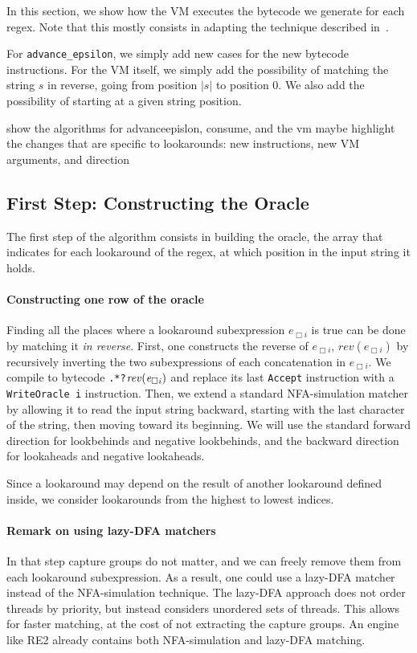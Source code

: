 \documentclass{article}
\renewcommand\cite\citep
\def\bytecode#1{\lstinline[style=byt]{#1}}
\def\regex#1{\lstinline[style=rgx]{#1}}
\def\todo#1{{\color{ACMOrange}{TODO: }}#1}
\def\size#1{\ensuremath{|#1|}}
\begin{document}
In this section, we show how the VM executes the bytecode we generate for each regex.
Note that this mostly consists in adapting the technique described in~\cite{regex_vm_approach}.

For \texttt{advance\_epsilon}, we simply add new cases for the new bytecode instructions.
For the VM itself, we simply add the possibility of matching the string $s$ in reverse, going from position $\size{s}$ to position 0.
We also add the possibility of starting at a given string position.

\todo{show the algorithms for advanceepislon, consume, and the vm}
\todo{maybe highlight the changes that are specific to lookarounds: new instructions, new VM arguments, and direction}

\subsection{First Step: Constructing the Oracle}

The first step of the algorithm consists in building the oracle, the array that indicates for each lookaround of the regex, at which position in the input string it holds.

\paragraph{Constructing one row of the oracle}
Finding all the places where a lookaround subexpression $e_{\Box i}$ is true can be done by matching it \textit{in reverse}.
First, one constructs the reverse of $e_{\Box i}$, $\mathit{rev}(e_{\Box i})$ by recursively inverting the two subexpressions of each concatenation in $e_{\Box i}$.
We compile to bytecode \regex{.*?}$\mathit{rev(\mathit{e}_{\Box i})}$ and replace its last \bytecode{Accept} instruction with a \bytecode{WriteOracle i} instruction.
Then, we extend a standard NFA-simulation matcher by allowing it to read the input string backward, starting with the last character of the string, then moving toward its beginning.
We will use the standard forward direction for lookbehinds and negative lookbehinds, and the backward direction for lookaheads and negative lookaheads.

Since a lookaround may depend on the result of another lookaround defined inside, we consider lookarounds from the highest to lowest indices.


\paragraph{Remark on using lazy-DFA matchers}
In that step capture groups do not matter, and we can freely remove them from each lookaround subexpression.
As a result, one could use a lazy-DFA matcher instead of the NFA-simulation technique.
The lazy-DFA approach does not order threads by priority, but instead considers unordered sets of threads.
This allows for faster matching, at the cost of not extracting the capture groups.
An engine like RE2 already contains both NFA-simulation and lazy-DFA matching.
\end{document}
